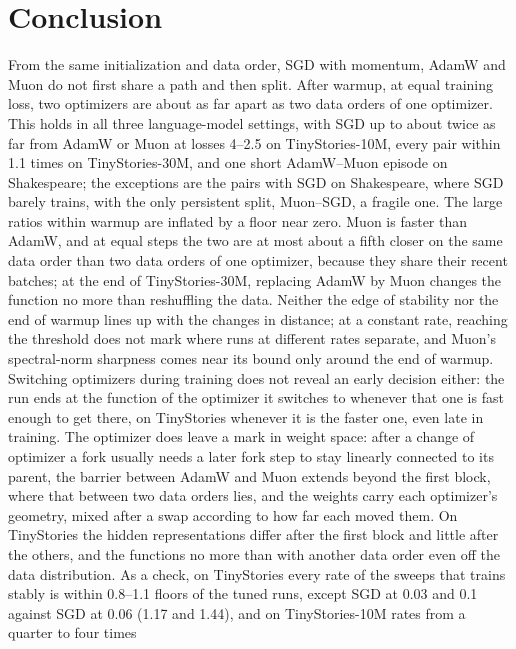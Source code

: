\documentclass[10pt]{article}
\begin{document}
\section{Conclusion}
\label{sec:conclusion}

From the same initialization and data order, SGD with momentum, AdamW and Muon do not first share a path and
then split. After warmup, at equal training loss, two optimizers are about as far apart as two data orders of one
optimizer. This holds in all three language-model settings, with SGD up to about twice as far from AdamW or
Muon at losses 4--2.5 on TinyStories-10M, every pair within 1.1 times on TinyStories-30M, and one short AdamW--Muon
episode on Shakespeare; the exceptions are the pairs with SGD on Shakespeare, where SGD barely trains, with the
only persistent split, Muon--SGD, a fragile one. The large ratios within warmup are inflated by a floor near zero.
Muon is faster than AdamW, and at equal steps the two are at most about a fifth closer on the same data order than
two data orders of one optimizer, because they share their recent batches; at the end of TinyStories-30M,
replacing AdamW by Muon changes the function no more than reshuffling the data. Neither the edge of stability nor
the end of warmup lines up with the changes in distance; at a constant rate, reaching the threshold does not mark where
runs at different rates separate, and Muon's spectral-norm sharpness comes near its bound only around the end of
warmup. Switching optimizers during training does not reveal an early decision either: the run ends at the
function of the optimizer it switches to whenever that one is fast enough to get there, on TinyStories whenever
it is the faster one, even late in training. The optimizer does
leave a mark in weight space: after a change of optimizer a fork usually needs a later fork step to stay
linearly connected to its parent, the barrier between AdamW and Muon extends beyond the first block, where that
between two data orders lies, and the weights carry each optimizer's geometry, mixed after a swap according to
how far each moved them. On TinyStories the hidden representations differ after the first block and little after
the others, and the functions no more than with another data order even off the data distribution. As a check,
on TinyStories every rate of the sweeps that trains stably is within 0.8--1.1 floors of the tuned runs, except
SGD at 0.03 and 0.1 against SGD at 0.06 (1.17 and 1.44), and on TinyStories-10M rates from a quarter to four times
\end{document}
